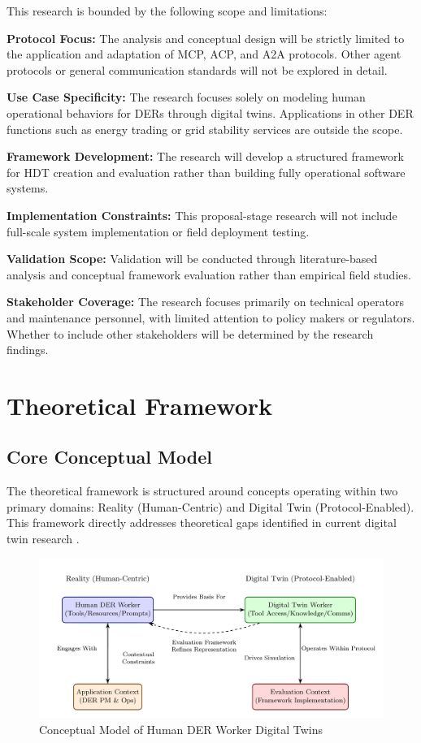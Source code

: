 \documentclass[12pt,a4paper]{article}
\begin{document}
This research is bounded by the following scope and limitations:

\textbf{Protocol Focus:} The analysis and conceptual design will be strictly limited to the application and adaptation of MCP, ACP, and A2A protocols. Other agent protocols or general communication standards will not be explored in detail.

\textbf{Use Case Specificity:} The research focuses solely on modeling human operational behaviors for DERs through digital twins. Applications in other DER functions such as energy trading or grid stability services are outside the scope.

\textbf{Framework Development:} The research will develop a structured framework for HDT creation and evaluation rather than building fully operational software systems.

\textbf{Implementation Constraints:} This proposal-stage research will not include full-scale system implementation or field deployment testing.

\textbf{Validation Scope:} Validation will be conducted through literature-based analysis and conceptual framework evaluation rather than empirical field studies.

\textbf{Stakeholder Coverage:} The research focuses primarily on technical operators and maintenance personnel, with limited attention to policy makers or regulators. Whether to include other stakeholders will be determined by the research findings.

\section{Theoretical Framework}
\label{sec:framework}

\subsection{Core Conceptual Model}

The theoretical framework is structured around concepts operating within two primary domains: Reality (Human-Centric) and Digital Twin (Protocol-Enabled). This framework directly addresses theoretical gaps identified in current digital twin research \cite{10.1186/s10033-024-00998-7} \cite{10.1016/j.ifacol.2022.09.675}.

\begin{figure}[h!]
    \centering
    \includegraphics[width=\linewidth]{conceptual-model-diagram-1.png}
    \caption{Conceptual Model of Human DER Worker Digital Twins}
    \label{fig:conceptual-model}
\end{figure}
\end{document}
